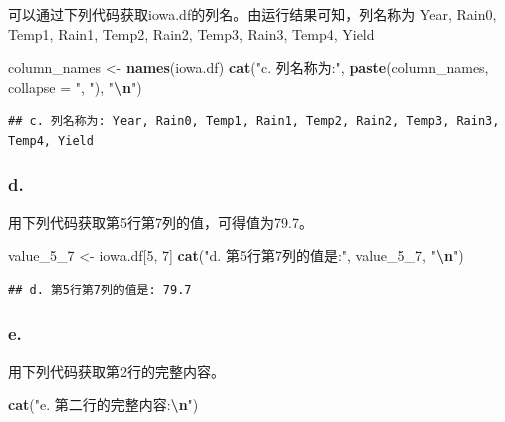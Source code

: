 \documentclass[
]{article}
\newenvironment{Shaded}{\begin{snugshade}}{\end{snugshade}}
\newcommand{\AttributeTok}[1]{\textcolor[rgb]{0.13,0.29,0.53}{#1}}
\newcommand{\DecValTok}[1]{\textcolor[rgb]{0.00,0.00,0.81}{#1}}
\newcommand{\FunctionTok}[1]{\textcolor[rgb]{0.13,0.29,0.53}{\textbf{#1}}}
\newcommand{\NormalTok}[1]{#1}
\newcommand{\OtherTok}[1]{\textcolor[rgb]{0.56,0.35,0.01}{#1}}
\newcommand{\SpecialCharTok}[1]{\textcolor[rgb]{0.81,0.36,0.00}{\textbf{#1}}}
\newcommand{\StringTok}[1]{\textcolor[rgb]{0.31,0.60,0.02}{#1}}
\begin{document}
可以通过下列代码获取iowa.df的列名。由运行结果可知，列名称为 Year, Rain0,
Temp1, Rain1, Temp2, Rain2, Temp3, Rain3, Temp4, Yield

\begin{Shaded}
\begin{Highlighting}[]
\NormalTok{column\_names }\OtherTok{\textless{}{-}} \FunctionTok{names}\NormalTok{(iowa.df)}
\FunctionTok{cat}\NormalTok{(}\StringTok{"c. 列名称为:"}\NormalTok{, }\FunctionTok{paste}\NormalTok{(column\_names, }\AttributeTok{collapse =} \StringTok{", "}\NormalTok{), }\StringTok{"}\SpecialCharTok{\textbackslash{}n}\StringTok{"}\NormalTok{)}
\end{Highlighting}
\end{Shaded}

\begin{verbatim}
## c. 列名称为: Year, Rain0, Temp1, Rain1, Temp2, Rain2, Temp3, Rain3, Temp4, Yield
\end{verbatim}

\subsubsection{d.}\label{d.}

用下列代码获取第5行第7列的值，可得值为79.7。

\begin{Shaded}
\begin{Highlighting}[]
\NormalTok{value\_5\_7 }\OtherTok{\textless{}{-}}\NormalTok{ iowa.df[}\DecValTok{5}\NormalTok{, }\DecValTok{7}\NormalTok{]}
\FunctionTok{cat}\NormalTok{(}\StringTok{"d. 第5行第7列的值是:"}\NormalTok{, value\_5\_7, }\StringTok{"}\SpecialCharTok{\textbackslash{}n}\StringTok{"}\NormalTok{)}
\end{Highlighting}
\end{Shaded}

\begin{verbatim}
## d. 第5行第7列的值是: 79.7
\end{verbatim}

\subsubsection{e.}\label{e.}

用下列代码获取第2行的完整内容。

\begin{Shaded}
\begin{Highlighting}[]
\FunctionTok{cat}\NormalTok{(}\StringTok{"e. 第二行的完整内容:}\SpecialCharTok{\textbackslash{}n}\StringTok{"}\NormalTok{)}
\end{Highlighting}
\end{Shaded}
\end{document}
